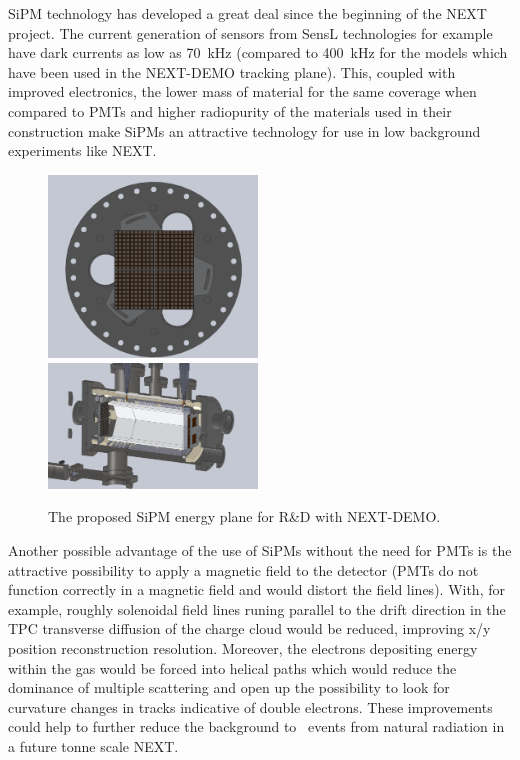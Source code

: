 \documentclass[a4paper,11pt,oneside]{article}
\begin{document}
SiPM technology has developed a great deal since the beginning of the
NEXT project. The current generation of sensors from SensL
technologies for example have dark currents as low as 70~kHz (compared
to 400~kHz for the models which have been used in the NEXT-DEMO
tracking plane). This, coupled
with improved electronics, the lower mass of material for the same
coverage when compared to PMTs and higher radiopurity of
the materials used in their construction make SiPMs an attractive
technology for use in low background experiments like NEXT.
\begin{figure}
  \begin{center}
    \includegraphics[width=0.495\textwidth]{img/siliEng}
    \includegraphics[width=0.495\textwidth]{img/siliNEXT}
  \end{center}
  \caption{The proposed SiPM energy plane for R\&D with NEXT-DEMO.}
  \label{fig:siliNEXT}
\end{figure}
Another possible advantage of the use of SiPMs without the need for
PMTs is the attractive possibility to apply a magnetic field to the
detector (PMTs do not function correctly in a magnetic field and would
distort the field lines). With, for example, roughly solenoidal field
lines runing parallel to the drift direction in the TPC transverse
diffusion of the charge cloud would be reduced, improving x/y position
reconstruction resolution. Moreover, the electrons depositing energy within
the gas would be forced into helical paths which would reduce the
dominance of multiple scattering and open up the possibility to look
for curvature changes in tracks indicative of double electrons. These
improvements could help to further reduce the background to \bbonu\
events from natural radiation in a future tonne scale NEXT.
\end{document}
